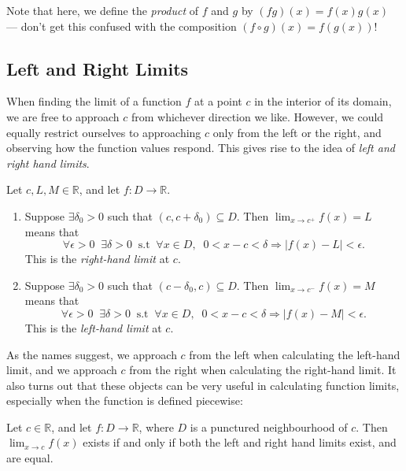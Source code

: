 \documentclass[
  10pt,
  a4paper]{article}
\providecommand{\tightlist}{%
  \setlength{\itemsep}{0pt}\setlength{\parskip}{0pt}}
\theoremstyle{plain}
\theoremstyle{definition}
\theoremstyle{plain}
\theoremstyle{plain}
\theoremstyle{plain}
\theoremstyle{plain}
\theoremstyle{definition}
\theoremstyle{definition}
\theoremstyle{remark}
\theoremstyle{remark}
\let\BeginKnitrBlock\begin \let\EndKnitrBlock\end
\begin{document}
Note that here, we define the \emph{product} of \(f\) and \(g\) by \((fg)(x) = f(x)g(x)\) --- don't get this confused with the composition \((f \circ g)(x) = f(g(x))\)!

\hypertarget{left-and-right-limits}{%
\subsection{Left and Right Limits}\label{left-and-right-limits}}

When finding the limit of a function \(f\) at a point \(c\) in the interior of its domain, we are free to approach \(c\) from whichever direction we like. However, we could equally restrict ourselves to approaching \(c\) only from the left or the right, and observing how the function values respond. This gives rise to the idea of \emph{left and right hand limits}.

\BeginKnitrBlock{definition}[Left and Right Hand Limits]
{\label{def:def1} }Let \(c, L, M \in \mathbb{R}\), and let \(f: D \to \mathbb{R}\).

\begin{enumerate}
\def\labelenumi{\arabic{enumi}.}
\tightlist
\item
  Suppose \(\exists \delta_0 > 0\) such that \((c, c + \delta_0) \subseteq D\). Then \(\lim_{x \to c^{+}}f(x) = L\) means that \[\forall \epsilon >0\;\;\exists \delta>0\;\;\text{s.t}\;\; \forall x \in D,\;\; 0 < x - c < \delta \Rightarrow \lvert f(x) - L \rvert < \epsilon.\] This is the \emph{right-hand limit} at \(c\).
\item
  Suppose \(\exists \delta_0 > 0\) such that \((c - \delta_0, c) \subseteq D\). Then \(\lim_{x \to c^{-}}f(x) = M\) means that \[\forall \epsilon >0\;\;\exists \delta>0\;\;\text{s.t}\;\; \forall x \in D,\;\; 0 < x - c < \delta \Rightarrow \lvert f(x) - M \rvert < \epsilon.\] This is the \emph{left-hand limit} at \(c\).
\end{enumerate}
\EndKnitrBlock{definition}

As the names suggest, we approach \(c\) from the left when calculating the left-hand limit, and we approach \(c\) from the right when calculating the right-hand limit. It also turns out that these objects can be very useful in calculating function limits, especially when the function is defined piecewise:

\BeginKnitrBlock{proposition}
{\label{prp:prop1} }Let \(c \in \mathbb{R}\), and let \(f: D \to \mathbb{R}\), where \(D\) is a punctured neighbourhood of \(c\). Then \(\lim_{x \to c}f(x)\) exists if and only if both the left and right hand limits exist, and are equal.
\EndKnitrBlock{proposition}
\end{document}
